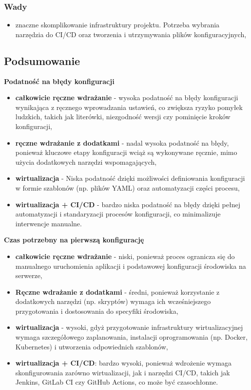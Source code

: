 \documentclass{article}
\begin{document}
\subsubsection{Wady}

\begin{itemize}
    \item znaczne skomplikowanie infrastruktury projektu. Potrzeba wybrania narzędzia do CI/CD oraz tworzenia i utrzymywania plików konfiguracyjnych,
\end{itemize}

\subsection{Podsumowanie}

\textbf{Podatność na błędy konfiguracji}
\begin{itemize}
    \item \textbf{całkowicie ręczne wdrażanie} - wysoka podatność na błędy konfiguracji wynikająca z ręcznego wprowadzania ustawień, co zwiększa ryzyko pomyłek ludzkich, takich jak literówki, niezgodność wersji czy pominięcie kroków konfiguracji,
    \item \textbf{ręczne wdrażanie z dodatkami} - nadal wysoka podatność na błędy, ponieważ kluczowe etapy konfiguracji wciąż są wykonywane ręcznie, mimo użycia dodatkowych narzędzi wspomagających,
    \item \textbf{wirtualizacja} - Niska podatność dzięki możliwości definiowania konfiguracji w formie szablonów (np. plików YAML) oraz automatyzacji części procesu,
    \item \textbf{wirtualizacja + CI/CD} - bardzo niska podatność na błędy dzięki pełnej automatyzacji i standaryzacji procesów konfiguracji, co minimalizuje interwencje manualne.
\end{itemize}

\textbf{Czas potrzebny na pierwszą konfigurację}
\begin{itemize}
    \item \textbf{całkowicie ręczne wdrażanie} - niski, ponieważ proces ogranicza się do manualnego uruchomienia aplikacji i podstawowej konfiguracji środowiska na serwerze,
    \item \textbf{Ręczne wdrażanie z dodatkami} - średni, ponieważ korzystanie z dodatkowych narzędzi (np. skryptów) wymaga ich wcześniejszego przygotowania i dostosowania do specyfiki środowiska,
    \item \textbf{wirtualizacja} - wysoki, gdyż przygotowanie infrastruktury wirtualizacyjnej wymaga szczegółowego zaplanowania, instalacji oprogramowania (np. Docker, Kubernetes) i utworzenia odpowiednich szablonów,
    \item \textbf{wirtualizacja + CI/CD}: bardzo wysoki, ponieważ wdrożenie wymaga skonfigurowania zarówno wirtualizacji, jak i narzędzi CI/CD, takich jak Jenkins, GitLab CI czy GitHub Actions, co może być czasochłonne.
\end{itemize}
\end{document}
